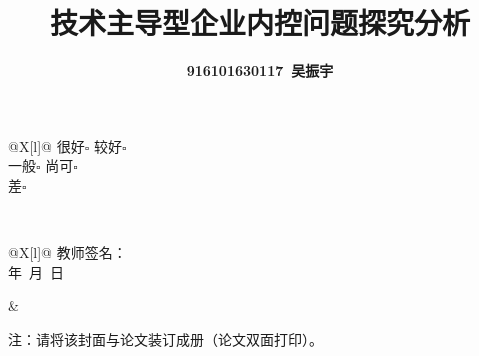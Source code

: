 \documentclass{ctexart}
\begin{document}
\begin{titlepage}
\begin{table}[htpb]
\begin{tabu}
\begin{tabu}{@{}X[l]@{}}
				 很好$ \square $ 较好$ \square $
				 \\
				 一般$ \square $ 尚可$ \square $
				 \\
				 差$ \square $
			 \end{tabu}
			 \\
			 \hline
			 \begin{tabu}{@{}X[l]@{}}
				 教师签名：
				 \\
				 年~月~日
			 \end{tabu}
			 &
			 \\
			 \hline
		\end{tabu}
		\begin{flushleft}
			\makebox[5\ccwd][c]{}注：请将该封面与论文装订成册（论文双面打印）。
		\end{flushleft}
	\end{table}
\end{titlepage}

\restoregeometry


\title{\heiti{}\textbf{技术主导型企业内控问题探究分析}}
\author{\kaishu{}\textbf{916101630117~吴振宇} }
\date{}
\maketitle
\end{document}
